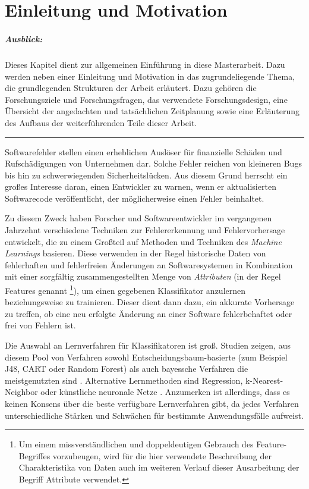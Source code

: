 
\chapter{Einleitung und Motivation}

\paragraph{Ausblick:}
Dieses Kapitel dient zur allgemeinen Einführung in diese Masterarbeit. Dazu werden neben einer Einleitung und Motivation in das zugrundeliegende Thema, die grundlegenden Strukturen der Arbeit erläutert. Dazu gehören die Forschungsziele und Forschungsfragen, das verwendete Forschungsdesign, eine Übersicht der angedachten und tatsächlichen Zeitplanung sowie eine Erläuterung des Aufbaus der weiterführenden Teile dieser Arbeit.
\\
\hrule

Softwarefehler stellen einen erheblichen Auslöser für finanzielle Schäden und Rufschädigungen von Unternehmen dar. Solche Fehler reichen von kleineren \glqq Bugs\grqq{} bis hin zu schwerwiegenden Sicherheitslücken. Aus diesem Grund herrscht ein großes Interesse daran, einen Entwickler zu warnen, wenn er aktualisierten Softwarecode veröffentlicht, der möglicherweise einen Fehler beinhaltet. 

Zu diesem Zweck haben Forscher und Softwareentwickler im vergangenen Jahrzehnt verschiedene Techniken zur Fehlererkennung und Fehlervorhersage entwickelt, die zu einem Großteil auf Methoden und Techniken des \emph{Machine Learnings} basieren. Diese verwenden in der Regel historische Daten von fehlerhaften und fehlerfreien Änderungen an Softwaresystemen in Kombination mit einer sorgfältig zusammengestellten Menge von \emph{Attributen} (in der Regel Features genannt \footnote{Um einem missverständlichen und doppeldeutigen Gebrauch des Feature-Begriffes vorzubeugen, wird für die hier verwendete Beschreibung der Charakteristika von Daten auch im weiteren Verlauf dieser Ausarbeitung der Begriff \glqq Attribute\grqq{} verwendet.}), um einen gegebenen Klassifikator anzulernen beziehungsweise zu trainieren. Dieser dient dann dazu, ein akkurate Vorhersage zu treffen, ob eine neu erfolgte Änderung an einer Software fehlerbehaftet oder frei von Fehlern ist.

Die Auswahl an Lernverfahren für Klassifikatoren ist groß. Studien zeigen, aus diesem Pool von Verfahren sowohl Entscheidungsbaum-basierte (zum Beispiel J48, CART oder Random Forest) als auch bayessche Verfahren die meistgenutzten sind \cite{Son2019}. Alternative Lernmethoden sind Regression, k-Nearest-Neighbor oder künstliche neuronale Netze \cite{Challagulla2008}. Anzumerken ist allerdings, dass es keinen Konsens über die beste verfügbare Lernverfahren gibt, da jedes Verfahren unterschiedliche Stärken und Schwächen für bestimmte Anwendungsfälle aufweist.

